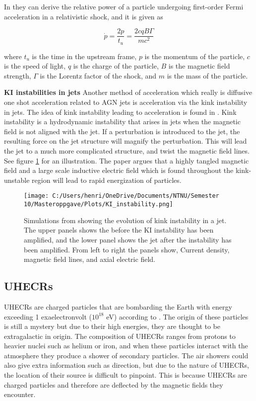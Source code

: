 In \cite{Dermer_2001} they can derive the relative power of a particle undergoing first-order Fermi acceleration in a relativistic shock, and it is given as 



\begin{equation}
    \dot p = \frac{2p}{t_u} = \frac{2cqB\Gamma}{mc^2 }
\end{equation}


where $t_u$ is the time in the upstream frame, $p$ is the momentum of the particle, $c$ is the speed of light, $q$ is the charge of the particle, $B$ is the magnetic field strength, $\Gamma$ is the Lorentz factor of the shock, and $m$ is the mass of the particle.

\textbf{KI instabilities in jets}
Another method of acceleration which really is diffusive one shot acceleration related to AGN jets is acceleration via the kink instability in jets. The idea of kink instability leading to acceleration is found in \cite{Alves_2018}. Kink instability is a hydrodynamic instability that arises in jets when the magnetic field is not aligned with the jet. If a perturbation is introduced to the jet, the resulting force on the jet structure will magnify the perturbation. This will lead the jet to a much more complicated structure, and twist the magnetic field lines. See figure \ref{fig:kink_instability} for an illustration. The paper argues that a highly tangled magnetic field and a large scale inductive electric field which is found throughout the kink-unstable region will lead to rapid energization of particles. 

\begin{figure}
    \centering
    \texttt{[image: C:/Users/henri/OneDrive/Documents/NTNU/Semester 10/Masteroppgave/Plots/KI\_instability.png]}
    \caption{Simulations from \cite{Alves_2018} showing the evolution of kink instability in a jet. The upper panels shows the before the KI instability has been amplified, and the lower panel shows the jet after the instability has been amplified. From left to right the panels show, Current density, magnetic field lines, and axial electric field. }
    \label{fig:kink_instability}
\end{figure}

\subsection{UHECRs}

UHECRs are charged particles that are bombarding the Earth with energy exceeding 1 exaelectronvolt ($10^{18}$ eV) according to \cite{Alves_Batista_2019}. The origin of 
these particles is still a mystery but due to their high energies, they are thought to be extragalactic in origin.
The composition of UHECRs ranges from protons to heavier nuclei such as helium or iron, and when these particles interact with the atmosphere they produce a shower of secondary particles.
The air showers could also give extra information such as direction, but due to the nature of UHECRs, the location of their source is
difficult to pinpoint. This is because UHECRs are charged particles and therefore are deflected by the magnetic fields they encounter.

